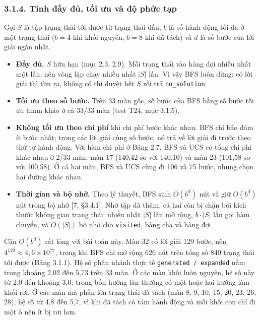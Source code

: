 \subsubsection{3.1.4. Tính đầy đủ, tối ưu và độ phức tạp}

Gọi \(S\) là tập trạng thái tới được từ trạng thái đầu, \(b\) là số hành động tối đa ở một trạng thái (\(b = 4\) khi khối nguyên, \(b = 8\) khi đã tách) và \(d\) là số bước của lời giải ngắn nhất.

\begin{itemize}
\tightlist
\item
  \textbf{Đầy đủ.} \(S\) hữu hạn (mục 2.3, 2.9). Mỗi trạng thái vào hàng đợi nhiều nhất một lần, nên vòng lặp chạy nhiều nhất \(|S|\) lần. Vì vậy BFS luôn dừng: có lời giải thì tìm ra, không có thì duyệt hết \(S\) rồi trả \texttt{no\_\allowbreak{}solution}.
\item
  \textbf{Tối ưu theo số bước.} Trên 33 màn gốc, số bước của BFS bằng số bước tối ưu tham khảo ở cả 33/33 màn (test T24, mục 3.1.5).
\item
  \textbf{Không tối ưu theo chi phí} khi chi phí bước khác nhau. BFS chỉ bảo đảm ít bước nhất; trong các lời giải cùng số bước, nó trả về lời giải đi trước theo thứ tự hành động. Với hàm chi phí ở Bảng 2.7, BFS và UCS có tổng chi phí khác nhau ở 2/33 màn: màn 17 (140,42 so với 140,10) và màn 23 (101,58 so với 100,58). Ở cả hai màn, BFS và UCS cùng đi 106 và 75 bước, nhưng chọn hai đường khác nhau.
\item
  \textbf{Thời gian và bộ nhớ.} Theo lý thuyết, BFS sinh \(O(b^d)\) nút và giữ \(O(b^d)\) nút trong bộ nhớ {[}7, §3.4.1{]}. Nhờ tập đã thăm, cả hai còn bị chặn bởi kích thước không gian trạng thái: nhiều nhất \(|S|\) lần mở rộng, \(b \cdot |S|\) lần gọi hàm chuyển, và \(O(|S|)\) bộ nhớ cho \texttt{visited}, bảng cha và hàng đợi.
\end{itemize}

Cận \(O(b^d)\) rất lỏng với bài toán này. Màn 32 có lời giải 129 bước, nên \(4^{129} \approx 4{,}6 \times 10^{77}\), trong khi BFS chỉ mở rộng 626 nút trên tổng số 840 trạng thái tới được (Bảng 3.1.1). Hệ số phân nhánh thực tế \texttt{generated /\allowbreak{} expanded} nằm trong khoảng 2,02 đến 5,73 trên 33 màn. Ở các màn khối luôn nguyên, hệ số này từ 2,0 đến khoảng 3,0: trong bốn hướng lăn thường có một hoặc hai hướng làm khối rơi. Ở các màn mà phần lớn trạng thái đã tách (màn 8, 9, 10, 15, 20, 23, 26, 28), hệ số từ 4,8 đến 5,7, vì khi đã tách có tám hành động và mỗi khối con chỉ đi một ô nên ít bị rơi hơn.


